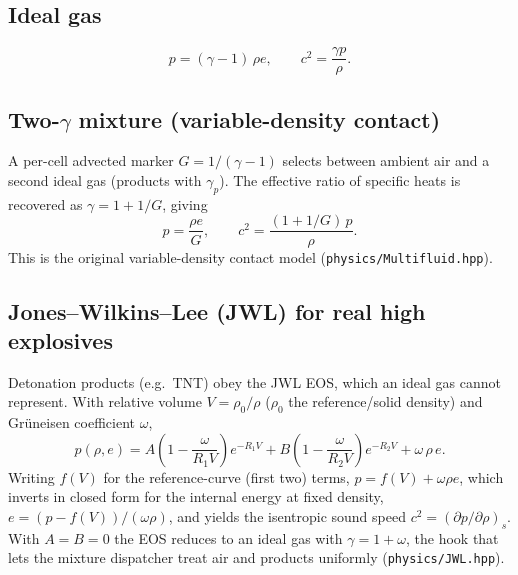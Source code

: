 \documentclass[11pt]{article}
\newcommand{\code}[1]{\texttt{#1}}
\begin{document}
\subsection{Ideal gas}
\begin{equation}
p = (\gamma-1)\,\rho e, \qquad c^2 = \frac{\gamma p}{\rho}.
\end{equation}

\subsection{Two-$\gamma$ mixture (variable-density contact)}
A per-cell advected marker $G = 1/(\gamma-1)$ selects between ambient air and a
second ideal gas (products with $\gamma_p$). The effective ratio of specific
heats is recovered as $\gamma = 1 + 1/G$, giving
\begin{equation}
p = \frac{\rho e}{G}, \qquad c^2 = \frac{(1+1/G)\,p}{\rho}.
\end{equation}
This is the original variable-density contact model (\code{physics/Multifluid.hpp}).

\subsection{Jones--Wilkins--Lee (JWL) for real high explosives}
\label{sec:jwl}
Detonation products (e.g.\ TNT) obey the JWL EOS, which an ideal gas cannot
represent. With relative volume $V = \rho_0/\rho$ ($\rho_0$ the reference/solid
density) and Gr\"uneisen coefficient $\omega$,
\begin{equation}
p(\rho,e) = A\!\left(1 - \frac{\omega}{R_1 V}\right)e^{-R_1 V}
          + B\!\left(1 - \frac{\omega}{R_2 V}\right)e^{-R_2 V}
          + \omega\,\rho\,e .
\end{equation}
Writing $f(V)$ for the reference-curve (first two) terms, $p = f(V) + \omega\rho e$,
which inverts in closed form for the internal energy at fixed density,
$e = (p - f(V))/(\omega\rho)$, and yields the isentropic sound speed
$c^2 = (\partial p/\partial\rho)_s$. With $A=B=0$ the EOS reduces to an ideal gas
with $\gamma = 1+\omega$, the hook that lets the mixture dispatcher treat air and
products uniformly (\code{physics/JWL.hpp}).
\end{document}
